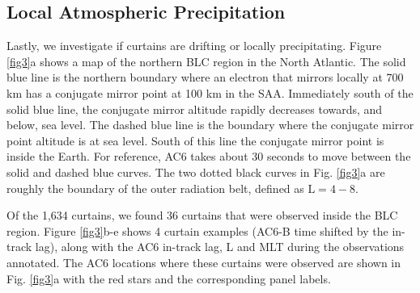 \documentclass[draft]{agujournal2019}
\begin{document}
\subsection{Local Atmospheric Precipitation}
Lastly, we investigate if curtains are drifting or locally precipitating. Figure \ref{fig3}a shows a map of the northern BLC region in the North Atlantic. The solid blue line is the northern boundary where an electron that mirrors locally at 700 km has a conjugate mirror point at 100 km in the SAA. Immediately south of the solid blue line, the conjugate mirror altitude rapidly decreases towards, and below, sea level. The dashed blue line is the boundary where the conjugate mirror point altitude is at sea level. South of this line the conjugate mirror point is inside the Earth. For reference, AC6 takes about 30 seconds to move between the solid and dashed blue curves. The two dotted black curves in Fig. \ref{fig3}a are roughly the boundary of the outer radiation belt, defined as $\mathrm{L}=4-8$.

Of the 1,634 curtains, we found 36 curtains that were observed inside the BLC region. Figure \ref{fig3}b-e shows 4 curtain examples (AC6-B time shifted by the in-track lag), along with the AC6 in-track lag, L and MLT during the observations annotated. The AC6 locations where these curtains were observed are shown in Fig. \ref{fig3}a with the red stars and the corresponding panel labels. 
\end{document}

